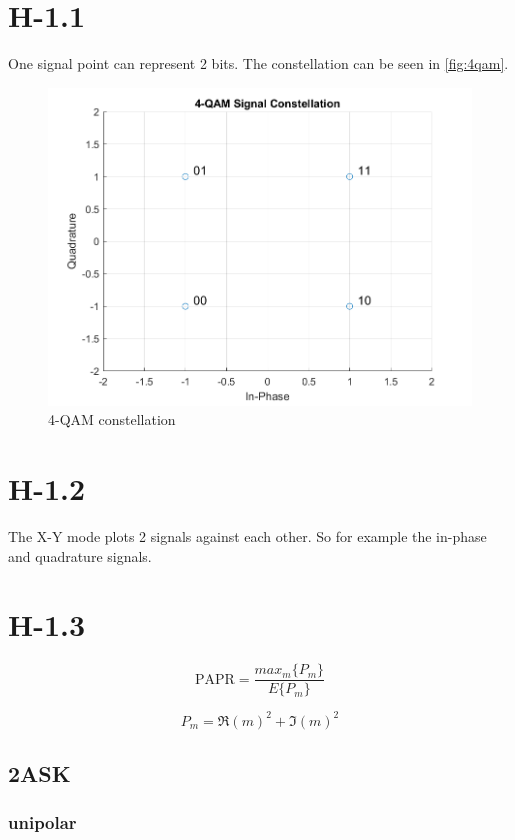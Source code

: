 \documentclass{article}
\begin{document}
\section{H-1.1}

One signal point can represent 2 bits. The constellation can be seen in \autoref{fig:4qam}.
\begin{figure}[h]
\centering
\includegraphics[width=\textwidth]{4_QAM.png}
\caption{4-QAM constellation}
\label{fig:4qam}
\end{figure}

\section{H-1.2}

The X-Y mode plots 2 signals against each other. So for example the in-phase and quadrature signals.

\section{H-1.3}

\begin{equation}
\textrm{PAPR} = \frac{max_m\{P_m\}}{E\{P_m\}}
\end{equation}

\begin{equation}
P_m = \Re{(m)}^2 + \Im{(m)}^2
\end{equation}
\subsection{2ASK}
\subsubsection{unipolar}
\end{document}
